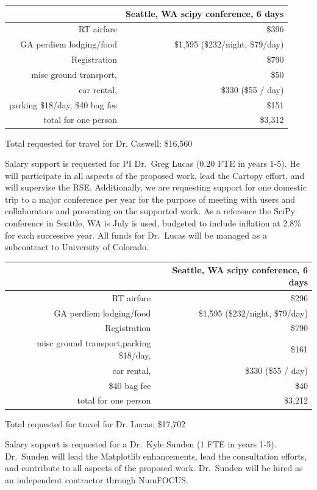 \documentclass[12pt]{article}
\numberwithin{page}{section}
\begin{document}
\begin{tabular}{|r|r|}
  \hline
  & Seattle, WA scipy conference, 6 days\\\hline
  RT airfare & \$396 \\\hline
  GA perdiem lodging/food & \$1,595 (\$232/night, \$79/day) \\\hline
  Registration & \$790 \\\hline
  misc ground transport, & \$50 \\\hline
  car rental, & \$330 (\$55 / day) \\\hline
  parking \@ \$18/day, \$40 bag fee & \$151 \\\hline\hline
  total for one person & \$3,312    \\\hline
\end{tabular}

Total requested for travel for Dr. Caswell: \$16,560

Salary support is requested for PI Dr.\ Greg Lucas (0.20 FTE in years 1-5).  He
will participate in all aspects of the proposed work, lead the Cartopy effort,
and will supervise the RSE.  Additionally, we are
requesting support for one domestic trip to a major conference per year for the
purpose of meeting with users and collaborators and presenting on the supported
work.  As a reference the SciPy conference in Seattle, WA is July is used,
budgeted to include inflation at 2.8\% for each successive year.  All funds for Dr.\ Lucas will be
managed as a subcontract to University of Colorado.


\begin{tabular}{|r|r|}
  \hline
  & Seattle, WA scipy conference, 6 days\\\hline
  RT airfare & \$296 \\\hline
  GA perdiem lodging/food & \$1,595 (\$232/night, \$79/day) \\\hline
  Registration & \$790 \\\hline
  misc ground transport,parking \@ \$18/day,  & \$161 \\\hline
  car rental, & \$330 (\$55 / day) \\\hline
  \$40 bag fee & \$40 \\\hline\hline
  total for one person & \$3,212    \\\hline
\end{tabular}

Total requested for travel for Dr. Lucas: \$17,702


Salary support is requested for a Dr.\ Kyle Sunden (1 FTE in years 1-5).
Dr.\ Sunden will lead the Matplotlib enhancements, lead the consultation
efforts, and contribute to all aspects of the proposed work.
Dr.\ Sunden will be hired as an independent contractor through NumFOCUS.
\end{document}
